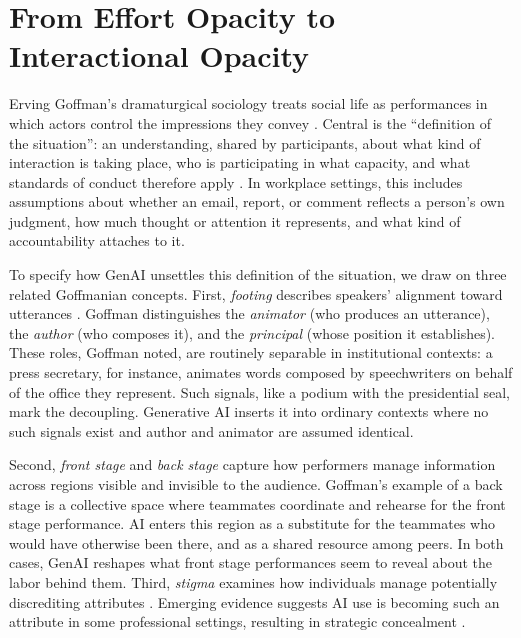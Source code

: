 \documentclass[pdflatex,sn-basic]{sn-jnl}%
\theoremstyle{thmstyleone}%
\theoremstyle{thmstyletwo}%
\theoremstyle{thmstylethree}%
\begin{document}
\section{From Effort Opacity to Interactional Opacity}

Erving Goffman's dramaturgical sociology treats social life as performances in which actors control the impressions they convey \citep{goffman1959presentation}. Central is the ``definition of the situation'': an understanding, shared by participants, about what kind of interaction is taking place, who is participating in what capacity, and what standards of conduct therefore apply \citep{goffman1974frame}. In workplace settings, this includes assumptions about whether an email, report, or comment reflects a person's own judgment, how much thought or attention it represents, and what kind of accountability attaches to it.

To specify how GenAI unsettles this definition of the situation, we draw on three related Goffmanian concepts. First, \textit{footing} describes speakers' alignment toward utterances \citep{goffman1981forms}. Goffman distinguishes the \textit{animator} (who produces an utterance), the \textit{author} (who composes it), and the \textit{principal} (whose position it establishes). These roles, Goffman noted, are routinely separable in institutional contexts: a press secretary, for instance, animates words composed by speechwriters on behalf of the office they represent. Such signals, like a podium with the presidential seal, mark the decoupling. Generative AI inserts it into ordinary contexts where no such signals exist and author and animator are assumed identical. 

Second, \textit{front stage} and \textit{back stage} capture how performers manage information across regions visible and invisible to the audience. Goffman's example of a back stage is a collective space where teammates coordinate and rehearse for the front stage performance. AI enters this region as a substitute for the teammates who would have otherwise been there, and as a shared resource among peers. In both cases, GenAI reshapes what front stage performances seem to reveal about the labor behind them. Third, \textit{stigma} examines how individuals manage potentially discrediting attributes \citep{goffman1963stigma}. Emerging evidence suggests AI use is becoming such an attribute in some professional settings, resulting in strategic concealment \citep{schilke2025transparency}.
\end{document}
